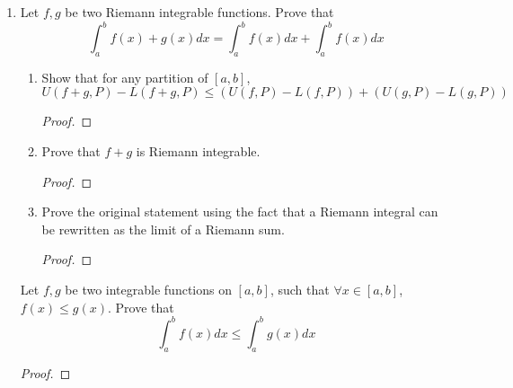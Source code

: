 \documentclass{article}
\newcommand{\<}{\langle}
\renewcommand{\>}{\rangle}
\begin{document}
\begin{enumerate}[(E1)]
\begin{enumerate}
\begin{proof}
    \end{proof}
    \item 
    Prove that $cf$ is Riemann integrable
    \begin{proof}
        
    \end{proof}
    \item 
    Prove the original statement using the fact that a Riemann integral can be rewritten as the limit of a Riemann sum.
    \begin{proof}
        
    \end{proof}
    \end{enumerate}
    \item 
    Let $f,g$ be two Riemann integrable functions. Prove that 
    $$ 
    \int_{a}^{b} f(x) + g(x)dx = \int_a^b f(x)dx + \int_a^b f(x)dx
    $$
    \begin{enumerate}
    \item 
    Show that for any partition of $[a,b]$, $U(f+g,P) - L(f+g,P) \leq (U(f,P) - L(f,P)) + (U(g,P) - L(g,P))$
    \begin{proof}
        
    \end{proof}
    \item 
    Prove that $f+g$ is Riemann integrable.
    \begin{proof}

    \end{proof}
    \item 
    Prove the original statement using the fact that a Riemann integral can be rewritten as the limit of a Riemann sum.
    \begin{proof}
        
    \end{proof}
    \end{enumerate}
    Let $f,g$ be two integrable functions on $[a,b]$, such that $\forall x \in [a,b]$, $f(x) \leq g(x)$. Prove that 
    $$
    \int_a^b f(x)dx \leq \int_a^b g(x)dx
    $$
    \begin{proof}
        
    \end{proof}
\end{enumerate}
\end{document}
